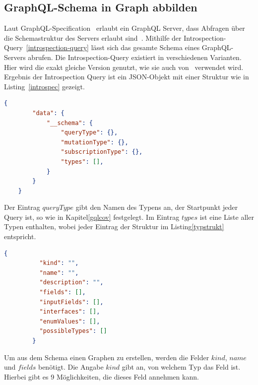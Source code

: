 \subsection{GraphQL-Schema in Graph abbilden}
\label{schemagraph}

Laut GraphQL-Specification~\cite{graphqlspecification} erlaubt ein GraphQL Server, dass Abfragen über die Schemastruktur des
Servers erlaubt sind~\cite[vgl. 4. Introspection]{graphqlspecification}.
Mithilfe der Introspection-Query~\ref{introspection-query} lässt sich das gesamte Schema eines GraphQL-Servers abrufen.
Die Introspection-Query existiert in verschiedenen Varianten.
Hier wird die exakt gleiche Version genutzt, wie sie auch von~\cite{property-based-testing} verwendet wird.
Ergebnis der Introspection Query ist ein JSON-Objekt mit einer Struktur wie in Listing~\ref{introspec} gezeigt.

\begin{lstlisting}[language=json, caption={Schema-Response},captionpos=b]
    {
        "data": {
            "__schema": {
                "queryType": {},
                "mutationType": {},
                "subscriptionType": {},
                "types": [],
            }
        }
    }
\end{lstlisting}
\label{introspec}

Der Eintrag $queryType$ gibt den Namen des Typens an, der Startpunkt jeder Query ist, so wie in Kapitel\ref{gqlcov} festgelegt.
Im Eintrag $types$ ist eine Liste aller Typen enthalten, wobei jeder Eintrag der Struktur im Listing\ref{typstrukt} entspricht.

\begin{lstlisting}[language=json, caption={Type-Field},captionpos=b]
        {
          "kind": "",
          "name": "",
          "description": "",
          "fields": [],
          "inputFields": [],
          "interfaces": [],
          "enumValues": [],
          "possibleTypes": []
        }
\end{lstlisting}
\label{typstrukt}


Um aus dem Schema einen Graphen zu erstellen, werden die Felder $kind$, $name$ und $fields$ benötigt.
Die Angabe $kind$ gibt an, von welchem Typ das Feld ist.
Hierbei gibt es 9 Möglichkeiten, die dieses Feld annehmen kann.

